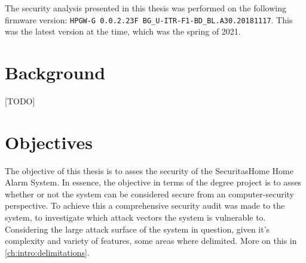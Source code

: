 \noindent The security analysis presented in this thesis was performed on the following firmware version: \texttt{HPGW-G 0.0.2.23F BG\_U-ITR-F1-BD\_BL.A30.20181117}. This was the latest version at the time, which was the spring of 2021.

\section{Background} \label{ch:intro:background}
[TODO]

\section{Objectives} \label{ch:intro:objectives}

The objective of this thesis is to asses the security of the SecuritasHome Home Alarm System. In essence, the objective in terms of the degree project is to asses whether or not the system can be considered secure from an computer-security perspective. To achieve this a comprehensive security audit was made to the system, to investigate which attack vectors the system is vulnerable to. Considering the large attack surface of the system in question, given it's complexity and variety of features, some areas where delimited. More on this in \ref{ch:intro:delimitations}.

